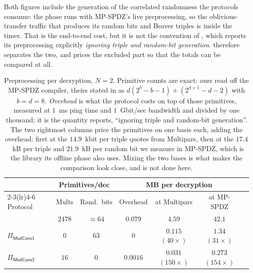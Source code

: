 Both figures include the generation of the correlated randomness the protocols consume: the phase runs with MP-SPDZ's live preprocessing, so the oblivious-transfer traffic that produces its random bits and Beaver triples is inside the timer.
That is the end-to-end cost, but it is not the convention of \cite[Table~5]{CCS:ZZLP25}, which reports its preprocessing explicitly \emph{ignoring triple and random-bit generation}.
 therefore separates the two, and prices the excluded part so that the totals can be compared at all.

\begin{table}[tbp]
    \caption{%
        Preprocessing per decryption, $N = 2$.
        Primitive counts are exact: ours read off the MP-SPDZ compiler, theirs stated in \cite{CCS:ZZLP25} as $d(2^b-b-1) + (2^{d+1}-d-2)$ with $b = d = 8$.
        \emph{Overhead} is what the protocol costs on top of those primitives, measured at $1$~ms ping time and $1$~Gbit/sec bandwidth and divided by one thousand; it is the quantity \cite[Table~5]{CCS:ZZLP25} reports, ``ignoring triple and random-bit generation''.
        The two rightmost columns price the primitives on one basis each, adding the overhead: first at the $14.9$~kbit per triple \cite{CCS:ZZLP25} quotes from Multipars, then at the $17.4$~kB per triple and $21.9$~kB per random bit we measure in MP-SPDZ, which is the library its offline phase also uses.
        Mixing the two bases is what makes the comparison look close, and is not done here.%
    }
    \label{tab:benchmark-preproc-cmp}
    \centering
    \small
    \setlength{\tabcolsep}{4pt}
    \begin{tabular}{@{}lcccccc@{}}
        \toprule
        & \multicolumn{2}{c}{Primitives/dec} & \multicolumn{3}{c}{MB per decryption} \\
        \cmidrule(lr){2-3}\cmidrule(lr){4-6}
        Protocol & Mults & Rand.\ bits & Overhead & at Multipars & at MP-SPDZ \\
        \midrule
        \cite{CCS:ZZLP25}        & $2478$ & ${\approx}64$ & $0.079$  & $4.59$              & $42.1$ \\
        $\Pi_\mathsf{ModConv1}$  & $0$    & $63$          & $0$      & $0.115$ $(40\times)$ & $1.34$ $(31\times)$ \\
        $\Pi_\mathsf{ModConv2}$  & $16$   & $0$           & $0.0016$ & $\bm{0.031}$ $(150\times)$ & $\bm{0.273}$ $(154\times)$ \\
        \bottomrule
    \end{tabular}
\end{table}

